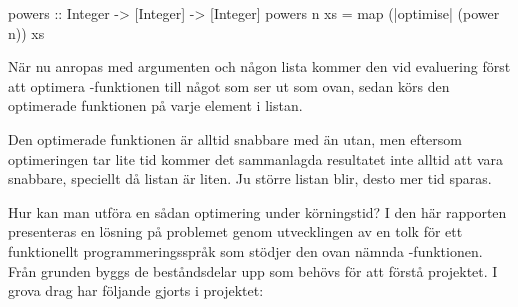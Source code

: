 \documentclass[Rapport]{subfiles}
\begin{document}
\begin{codeExDiff}
powers :: Integer -> [Integer] -> [Integer]
powers n xs = map (|optimise| (power n)) xs
\end{codeExDiff}

När nu  anropas med argumenten  och någon lista  kommer
den vid evaluering först att optimera -funktionen till något som 
ser ut som  ovan, sedan körs den optimerade funktionen på varje
element i listan.

Den optimerade funktionen är alltid snabbare med  än utan, men eftersom
optimeringen tar lite tid kommer det sammanlagda resultatet inte alltid att vara
snabbare, speciellt då listan  är liten. 
Ju större listan  blir, desto mer tid sparas.

Hur kan man utföra en sådan optimering under körningstid? I den här rapporten
presenteras en lösning på problemet genom utvecklingen av en tolk för ett
funktionellt programmeringsspråk som stödjer den ovan nämnda -funktionen. 
Från grunden byggs de beståndsdelar upp som behövs för att förstå projektet.
I grova drag har följande gjorts i projektet:

\begin{comment}
Koens kommentar:
"Bidrag" separat


skriv lite mer om rapportens uppbyggnad
1. i rätt ordning
2. läsaren? vad menas med detta?
            bra fråga såklart... låt mig tänka
            vet inte men hur överblicken såg ut förut så var det referenser
            först till ektion 3, sen 2 sen 4 osv, han kanske tänkte sig
            en bit med stöd till läsaren också
            har nu flyttat om dem så att de är i ordning iaf
            gott!
            det blir bra
            jag tuggar vidare :D
            fast inte separerat bidrag och överblickish
            then fire z'missiles! men känns onaturligt
            jag håller egentligen med. det blir duplicering. hur ska det skrivas
            på ett naturligt sätt? vet inte riktigt. men ganska likt så som vi hade det fast i ordning och lite mer utvecklat
            tror jag inte blir helt fel
vill vi separera bidrag? ja
\end{comment}
\end{document}
